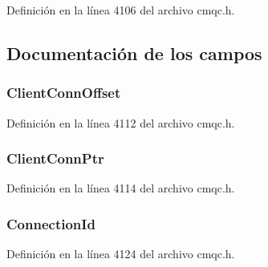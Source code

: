 Definición en la línea 4106 del archivo cmqc.\+h.



\subsection{Documentación de los campos}
\hypertarget{structtag_m_q_c_n_o_ab4e4fcacd66e164d2a244ebcb25fbb7c}{}
\subsubsection[{Client\+Conn\+Offset}]{ Client\+Conn\+Offset}\label{structtag_m_q_c_n_o_ab4e4fcacd66e164d2a244ebcb25fbb7c}


Definición en la línea 4112 del archivo cmqc.\+h.

\hypertarget{structtag_m_q_c_n_o_a9e3caa54a09c6a065efeddfcb08449b3}{}
\subsubsection[{Client\+Conn\+Ptr}]{ Client\+Conn\+Ptr}\label{structtag_m_q_c_n_o_a9e3caa54a09c6a065efeddfcb08449b3}


Definición en la línea 4114 del archivo cmqc.\+h.

\hypertarget{structtag_m_q_c_n_o_a82a7b183d6b1a0a9f423a5194cef7577}{}
\subsubsection[{Connection\+Id}]{ Connection\+Id}\label{structtag_m_q_c_n_o_a82a7b183d6b1a0a9f423a5194cef7577}


Definición en la línea 4124 del archivo cmqc.\+h.

\hypertarget{structtag_m_q_c_n_o_a5beb55e47cd784cb266d9744248886b5}{}
